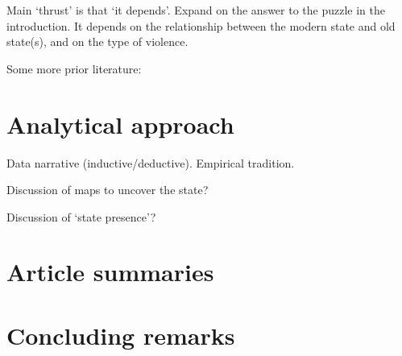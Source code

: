 \documentclass[12pt]{article}
\begin{document}
Main `thrust' is that `it depends'. Expand on the answer to the puzzle in the
introduction. It depends on the relationship between the modern state and old
state(s), and on the type of violence.

Some more prior literature: \citet{Griffiths2016} \citet{Ahram2019}

\section{Analytical approach} \label{Analytical approach}

Data narrative (inductive/deductive). Empirical tradition.

Discussion of maps to uncover the state?

Discussion of `state presence'?

\section{Article summaries} \label{Article summaries}

\section{Concluding remarks} \label{Concluding remarks}

\pagebreak



\end{document}
